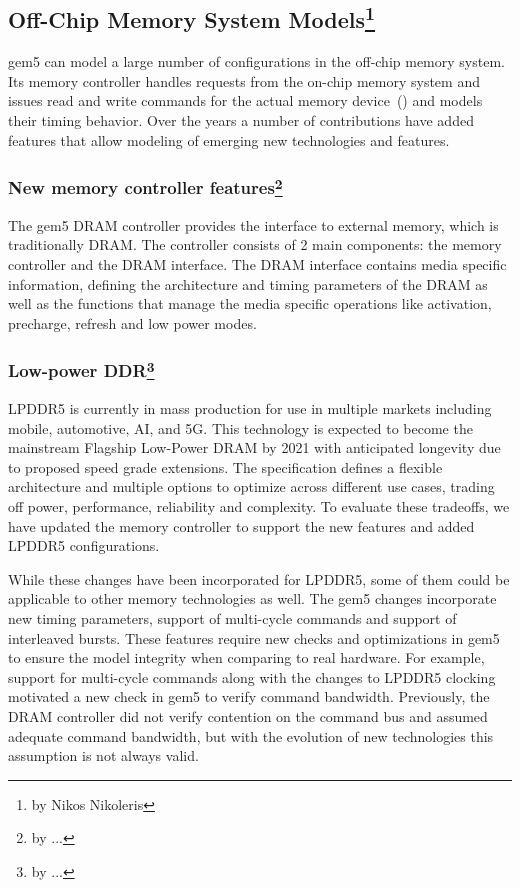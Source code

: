 \subsection[Off-Chip Memory System Models]{Off-Chip Memory System Models\footnote{by Nikos Nikoleris}}

gem5 can model a large number of configurations in the off-chip memory system.
Its memory controller handles requests from the on-chip memory system and issues read and write commands for the actual memory device~\cite{}() and models their timing behavior.
Over the years a number of contributions have added features that allow modeling of emerging new technologies and features.

\subsubsection[New memory controller features]{New memory controller features\footnote{by ...}}

The gem5 DRAM controller provides the interface to external memory, which is traditionally DRAM.
The controller consists of 2 main components: the memory controller and the DRAM interface.
The DRAM interface contains media specific information, defining the architecture and timing parameters of the DRAM as well as the functions that manage the media specific operations like activation, precharge, refresh and low power modes.

\subsubsection[Low-power DDR]{Low-power DDR\footnote{by ...}}

LPDDR5 is currently in mass production for use in multiple markets including mobile, automotive, AI, and 5G.
This technology is expected to become the mainstream Flagship Low-Power DRAM by 2021 with anticipated longevity due to proposed speed grade extensions.
The specification defines a flexible architecture and multiple options to optimize across different use cases, trading off power, performance, reliability and complexity.
To evaluate these tradeoffs, we have updated the memory controller to support the new features and added LPDDR5 configurations.

While these changes have been incorporated for LPDDR5, some of them could be applicable to other memory technologies as well.
The gem5 changes incorporate new timing parameters, support of multi-cycle commands and support of interleaved bursts.
These features require new checks and optimizations in gem5 to ensure the model integrity when comparing to real hardware.
For example, support for multi-cycle commands along with the changes to LPDDR5 clocking motivated a new check in gem5 to verify command bandwidth.
Previously, the DRAM controller did not verify contention on the command bus and assumed adequate command bandwidth, but with the evolution of new technologies this assumption is not always valid.

